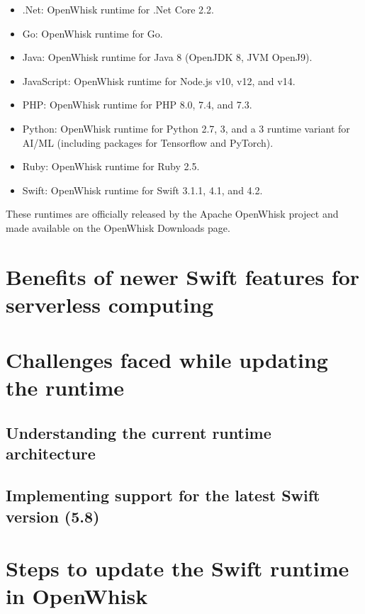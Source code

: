 \begin{itemize}
\item .Net: OpenWhisk runtime for .Net Core 2.2.
\item Go: OpenWhisk runtime for Go.
\item Java: OpenWhisk runtime for Java 8 (OpenJDK 8, JVM OpenJ9).
\item JavaScript: OpenWhisk runtime for Node.js v10, v12, and v14.
\item PHP: OpenWhisk runtime for PHP 8.0, 7.4, and 7.3.
\item Python: OpenWhisk runtime for Python 2.7, 3, and a 3 runtime variant for AI/ML (including packages for Tensorflow and PyTorch).
\item Ruby: OpenWhisk runtime for Ruby 2.5.
\item Swift: OpenWhisk runtime for Swift 3.1.1, 4.1, and 4.2.
\end{itemize}

These runtimes are officially released by the Apache OpenWhisk project and made available on the OpenWhisk Downloads page.

\section{Benefits of newer Swift features for serverless computing}

\section{Challenges faced while updating the runtime}

\subsection{Understanding the current runtime architecture}

\subsection{Implementing support for the latest Swift version (5.8)}

\section{Steps to update the Swift runtime in OpenWhisk}

